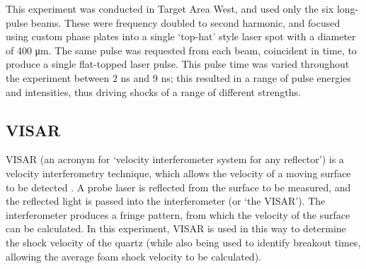 

This experiment was conducted in Target Area West, and used only the six long-pulse beams. These were frequency doubled to second harmonic, and focused using custom phase plates into a single `top-hat' style laser spot with a diameter of 400 \unit{\micro\meter}. The same pulse was requested from each beam, coincident in time, to produce a single flat-topped laser pulse. This pulse time was varied throughout the experiment between 2 \unit{\nano\second} and 9 \unit{\nano\second}; this resulted in a range of pulse energies and intensities, thus driving shocks of a range of different strengths.

\subsection{VISAR}

VISAR (an acronym for `velocity interferometer system for any reflector') is a velocity interferometry technique, which allows the velocity of a moving surface to be detected \cite{Barker2000, Barker1972}. A probe laser is reflected from the surface to be measured, and the reflected light is passed into the interferometer (or `the VISAR'). The interferometer produces a fringe pattern, from which the velocity of the surface can be calculated. In this experiment, VISAR is used in this way to determine the shock velocity of the quartz (while also being used to identify breakout times, allowing the average foam shock velocity to be calculated).

